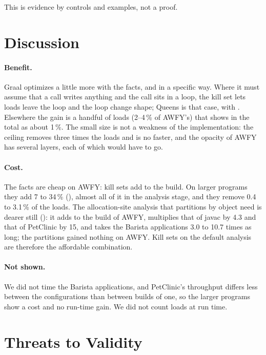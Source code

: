 This is evidence by controls and examples, not a proof.

\section{Discussion}\label{sec:eval-discussion}

\paragraph{Benefit.} Graal optimizes a little more with the facts, and in a specific way. Where it must assume that a call writes
anything and the call sits in a loop, the kill set lets loads leave the loop and the loop change shape; Queens is that case,
with . Elsewhere the gain is a handful of loads (2--4\,\% of AWFY's) that shows in the total as about 1\,\%. The
small size is not a weakness of the implementation: the ceiling removes three times the loads and is no faster, and the
opacity of AWFY has several layers, each of which would have to go.

\paragraph{Cost.} The facts are cheap on AWFY: kill sets add  to the build. On larger programs they add 7 to 34\,\%
(), almost all of it in the analysis stage, and they remove 0.4 to 3.1\,\% of the loads. The allocation-site analysis that partitions by object need is dearer still
(): it adds  to the build of AWFY, multiplies that of javac by 4.3 and that of PetClinic by 15,
and takes the Barista applications 3.0 to 10.7 times as long; the partitions gained nothing on AWFY. Kill sets on the default
analysis are therefore the affordable combination.

\paragraph{Not shown.} We did not time the Barista applications, and PetClinic's throughput differs less between the
configurations than between builds of one, so the larger programs show a cost and no run-time gain. We did not count loads at
run time.

\section{Threats to Validity}\label{sec:eval-threats}

